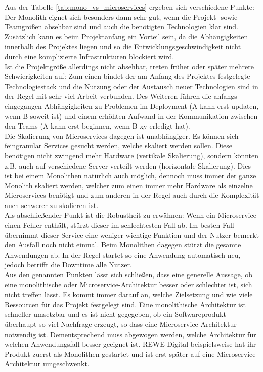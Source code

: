 Aus der Tabelle \ref{tab:mono_vs_microservices} ergeben sich verschiedene Punkte: Der Monolith eignet sich besonders dann sehr gut, wenn die Projekt- sowie Teamgrößen absehbar sind und auch die benötigten Technologien klar sind. Zusätzlich kann es beim Projektanfang ein Vorteil sein, da die Abhängigkeiten innerhalb des Projektes liegen und so die Entwicklungsgeschwindigkeit nicht durch eine komplizierte Infrastrukturen blockiert wird. \\

Ist die Projektgröße allerdings nicht absehbar, treten früher oder später mehrere Schwierigkeiten auf: Zum einen bindet der am Anfang des Projektes festgelegte Technologiestack und die Nutzung oder der Austausch neuer Technologien sind in der Regel mit sehr viel Arbeit verbunden. Des Weiteren führen die anfangs eingegangen Abhängigkeiten zu Problemen im Deployment (A kann erst updaten, wenn B soweit ist) und einem erhöhten Aufwand in der Kommunikation zwischen den Teams (A kann erst beginnen, wenn B xy erledigt hat). \\

Die Skalierung von Microservices dagegen ist unabhängiger. Es können sich feingranular Services gesucht werden, welche skaliert werden sollen. Diese benötigen nicht zwingend mehr Hardware (vertikale Skalierung), sondern könnten z.B. auch auf verschiedene Server verteilt werden (horizontale Skalierung). Dies ist bei einem Monolithen natürlich auch möglich, dennoch muss immer der ganze Monolith skaliert werden, welcher zum einen immer mehr Hardware als einzelne Microservices benötigt und zum anderen in der Regel auch durch die Komplexität auch schwerer zu skalieren ist.\cite{wolff2018mic_praxis}\\

Als abschließender Punkt ist die Robustheit zu erwähnen: Wenn ein Microservice einen Fehler enthält, stürzt dieser im schlechtesten Fall ab. Im besten Fall übernimmt dieser Service eine weniger wichtige Funktion und der Nutzer bemerkt den Ausfall noch nicht einmal. Beim Monolithen dagegen stürzt die gesamte Anwendungen ab. In der Regel startet so eine Anwendung automatisch neu, jedoch betrifft die Downtime alle Nutzer. \\

Aus den genannten Punkten lässt sich schließen, dass eine generelle Aussage, ob eine monolithische oder Microservice-Architektur besser oder schlechter ist, sich nicht treffen lässt. Es kommt immer darauf an, welche Zielsetzung und wie viele Ressourcen für das Projekt festgelegt sind. Eine monolithische Architektur ist schneller umsetzbar und es ist nicht gegegeben, ob ein Softwareprodukt überhaupt so viel Nachfrage erzeugt, so dass eine Microservice-Architektur notwendig ist. Dementsprechend muss abgewogen werden, welche Architektur für welchen Anwendungsfall besser geeignet ist.\cite{wolff2018mic_praxis} REWE Digital beispielsweise hat ihr Produkt zuerst als Monolithen gestartet und ist erst später auf eine Microservice-Architektur umgeschwenkt.\cite{rewe2019mic_ppp} 

